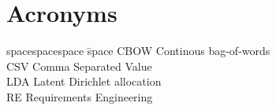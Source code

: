\section*{Acronyms}

\begin{tabbing}
spacespacespace \= space \kill
CBOW \> Continous bag-of-words \\
CSV \> Comma Separated Value \\
LDA	\>	Latent Dirichlet allocation \\
RE	\>	Requirements Engineering \\
\end{tabbing}
